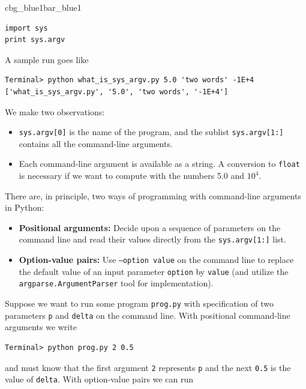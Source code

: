 \documentclass[%
oneside,                 %
final,                   %
10pt]{article}
\newenvironment{_pro_tight}[2]{
   \def\FrameCommand{\color{#2}\vrule width 1mm\normalcolor\colorbox{#1}}
   \FrameRule0.6pt\MakeFramed {\advance\hsize-2mm\FrameRestore}\vskip3mm}
   {\vskip0mm\endMakeFramed}
\newenvironment{pro}[2]{
\bgroup\rmfamily
\fboxsep=0mm\relax
\begin{_pro_tight}{#1}{#2}
\list{}{\parsep=-2mm\parskip=0mm\topsep=0pt\leftmargin=2mm
\rightmargin=2\leftmargin\leftmargin=4pt\relax}
\item\relax}
{\endlist\end{_pro_tight}\egroup}
\begin{document}
\begin{pro}{cbg_blue1}{bar_blue1}\begin{Verbatim}[numbers=none,fontsize=\fontsize{9pt}{9pt},baselinestretch=0.95,xleftmargin=2mm]
import sys
print sys.argv
\end{Verbatim}
\end{pro}
\noindent
A sample run goes like

\begin{Verbatim}[frame=lines,label=\fbox{{\tiny Terminal}},framesep=2.5mm,framerule=0.7pt,fontsize=\fontsize{9pt}{9pt}]
Terminal> python what_is_sys_argv.py 5.0 'two words' -1E+4
['what_is_sys_argv.py', '5.0', 'two words', '-1E+4']
\end{Verbatim}
We make two observations:

\begin{itemize}
 \item \texttt{sys.argv[0]} is the name of the program,
   and the sublist \texttt{sys.argv[1:]} contains all the command-line arguments.

 \item Each command-line argument is available as a string. A conversion to
   \texttt{float} is necessary if we want to compute with the numbers 5.0 and
   $10^4$.
\end{itemize}

\noindent
There are, in principle, two ways of programming with
command-line arguments in Python:

\begin{itemize}
 \item \textbf{Positional arguments:} Decide upon a sequence of parameters
   on the command line and read
   their values directly from the \texttt{sys.argv[1:]} list.

 \item \textbf{Option-value pairs:}  Use \texttt{--option value} on
   the command line to replace the default value of an input parameter
   \texttt{option} by \texttt{value} (and utilize the \texttt{argparse.ArgumentParser} tool
   for implementation).
\end{itemize}

\noindent
Suppose we want to run some program \texttt{prog.py} with
specification of two parameters \texttt{p} and \texttt{delta} on the command line.
With positional command-line arguments we write

\begin{Verbatim}[frame=lines,label=\fbox{{\tiny Terminal}},framesep=2.5mm,framerule=0.7pt,fontsize=\fontsize{9pt}{9pt}]
Terminal> python prog.py 2 0.5
\end{Verbatim}
and must know that the first argument \texttt{2} represents \texttt{p} and the
next \texttt{0.5} is the value of \texttt{delta}.
With option-value pairs we can run
\end{document}
